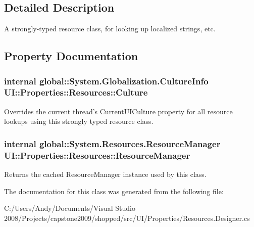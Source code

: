 \subsection{Detailed Description}
A strongly-\/typed resource class, for looking up localized strings, etc. 

\subsection{Property Documentation}
\hypertarget{class_u_i_1_1_properties_1_1_resources_a46a0e9bbbbdb0717d4a25428483b2728}{
\subsubsection[{Culture}]{\setlength{\rightskip}{0pt plus 5cm}internal global::System.Globalization.CultureInfo UI::Properties::Resources::Culture}}
\label{class_u_i_1_1_properties_1_1_resources_a46a0e9bbbbdb0717d4a25428483b2728}


Overrides the current thread's CurrentUICulture property for all resource lookups using this strongly typed resource class. \hypertarget{class_u_i_1_1_properties_1_1_resources_a8766fbe41ebf10ebf9984cbe9e4ad7f9}{
\subsubsection[{ResourceManager}]{\setlength{\rightskip}{0pt plus 5cm}internal global::System.Resources.ResourceManager UI::Properties::Resources::ResourceManager}}
\label{class_u_i_1_1_properties_1_1_resources_a8766fbe41ebf10ebf9984cbe9e4ad7f9}


Returns the cached ResourceManager instance used by this class. 

The documentation for this class was generated from the following file:\begin{DoxyCompactItemize}
\item 
C:/Users/Andy/Documents/Visual Studio 2008/Projects/capstone2009/shopped/src/UI/Properties/Resources.Designer.cs\end{DoxyCompactItemize}
